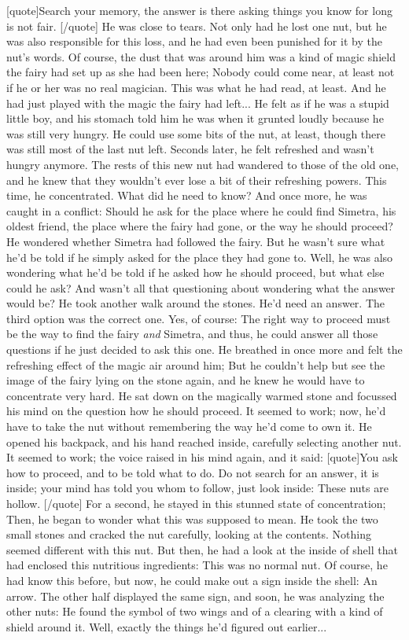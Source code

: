 [quote]Search your memory, the answer is there 
asking things you know for long is not fair. 
[/quote]
He was close to tears. Not only had he lost one nut, but he was also responsible for this loss, and he had even been punished for it by the nut's words. Of course, the dust that was around him was a kind of magic shield the fairy had set up as she had been here; Nobody could come near, at least not if he or her was no real magician. This was what he had read, at least. And he had just played with the magic the fairy had left... 
He felt as if he was a stupid little boy, and his stomach told him he was when it grunted loudly because he was still very hungry. He could use some bits of the nut, at least, though there was still most of the last nut left. 
Seconds later, he felt refreshed and wasn't hungry anymore. The rests of this new nut had wandered to those of the old one, and he knew that they wouldn't ever lose a bit of their refreshing powers. 
This time, he concentrated. What did he need to know? And once more, he was caught in a conflict: Should he ask for the place where he could find Simetra, his oldest friend, the place where the fairy had gone, or the way he should proceed? He wondered whether Simetra had followed the fairy. But he wasn't sure what he'd be told if he simply asked for the place they had gone to. Well, he was also wondering what he'd be told if he asked how he should proceed, but what else could he ask? And wasn't all that questioning about wondering what the answer would be? 
He took another walk around the stones. He'd need an answer. The third option was the correct one. Yes, of course: The right way to proceed must be the way to find the fairy \emph{and} Simetra, and thus, he could answer all those questions if he just decided to ask this one. 
He breathed in once more and felt the refreshing effect of the magic air around him; But he couldn't help but see the image of the fairy lying on the stone again, and he knew he would have to concentrate very hard. He sat down on the magically warmed stone and focussed his mind on the question how he should proceed. It seemed to work; now, he'd have to take the nut without remembering the way he'd come to own it. He opened his backpack, and his hand reached inside, carefully selecting another nut. 
It seemed to work; the voice raised in his mind again, and it said: 
[quote]You ask how to proceed, 
and to be told what to do. 
Do not search for an answer, 
it is inside; 
your mind has told you whom to follow, 
just look inside: These nuts are hollow. 
[/quote]
For a second, he stayed in this stunned state of concentration; Then, he began to wonder what this was supposed to mean. He took the two small stones and cracked the nut carefully, looking at the contents. Nothing seemed different with this nut. But then, he had a look at the inside of shell that had enclosed this nutritious ingredients: This was no normal nut. Of course, he had know this before, but now, he could make out a sign inside the shell: An arrow. The other half displayed the same sign, and soon, he was analyzing the other nuts: He found the symbol of two wings and of a clearing with a kind of shield around it. Well, exactly the things he'd figured out earlier... 
